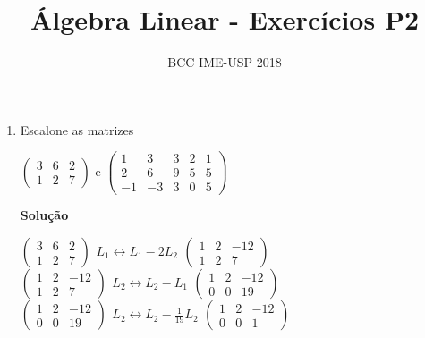 \documentclass[12pt]{article}
\author{BCC IME-USP 2018}
\title{Álgebra Linear - Exercícios P2}
\begin{document}
\maketitle
\begin{enumerate}
	\item
		Escalone as matrizes
		\begin{center}
			$\begin{pmatrix}
			3 & 6 & 2 \\ 1 & 2 & 7
			\end{pmatrix}$
			e
			$\begin{pmatrix}
			1 & 3 & 3 & 2 & 1 \\ 2 & 6 & 9 & 5 & 5 \\ -1 & -3 & 3 & 0 & 5
			\end{pmatrix}$
		\end{center}
	\textbf{Solução}
		\begin{center}
		$\begin{pmatrix}
			3 & 6 & 2 \\ 1 & 2 & 7
		\end{pmatrix}
		\begin{matrix}
			L_1 \leftrightarrow L_1 - 2L_2
		\end{matrix}
		\begin{pmatrix}
			1 & 2 & -12 \\ 1 & 2 & 7
		\end{pmatrix}$\\[10pt]
		$\begin{pmatrix}
			1 & 2 & -12 \\ 1 & 2 & 7
		\end{pmatrix}
		\begin{matrix}
			L_2 \leftrightarrow L_2 - L_1
		\end{matrix}		
		\begin{pmatrix}
			1 & 2 & -12 \\ 0 & 0 & 19
		\end{pmatrix}		
		$\\[10pt]
		$\begin{pmatrix}
			1 & 2 & -12 \\ 0 & 0 & 19
		\end{pmatrix}
		\begin{matrix}
			L_2 \leftrightarrow L_2 - \frac{1}{19} L_2
		\end{matrix}
		\begin{pmatrix}
			1 & 2 & -12 \\ 0 & 0 & 1
		\end{pmatrix}			
		$		
		\end{center}

\end{enumerate}
\end{document}
